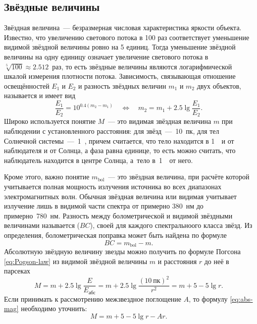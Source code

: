 \subsection{Звёздные величины}
Звёздная величина~--- безразмерная числовая характеристика яркости объекта. Известно, что увеличению светового потока в 100 раз соответствует уменьшение видимой звёздной величины ровно на 5 единиц. Тогда уменьшение звёздной величины на одну единицу означает увеличение светового потока в $\sqrt[5]{100}\approx 2.512$~раз, то есть звёздные величины являются логарифмической шкалой измерения плотности потока. Зависимость, связывающая отношение освещённостей $E_1$ и $E_2$ и разность звёздных величин $m_1$ и $m_2$ двух объектов, называется  и имеет вид
\begin{equation}
	\frac{E_1}{E_2} = 10^{0.4(m_2 - m_1)} \quad \Longleftrightarrow \quad m_2 = m_1 + 2.5 \lg \frac{E_1}{E_2}.
	\label{eq:Pogson-law}
\end{equation}
Широко используется понятие  $M$~--- это видимая звёздная величина $m$ при наблюдении с установленного расстояния: для звёзд~---~10~пк, для тел Солнечной системы~---~1~\au, причем считается, что тело находится в 1~\au~и от наблюдателя и от Солнца, а фаза равна единице, то есть можно считать, что наблюдатель находится в центре Солнца, а~тело в~1~\au~от него. 

Кроме этого, важно понятие  $m_\text{bol}$~--- это звёздная величина, при расчёте которой учитывается полная мощность излучения источника во всех диапазонах электромагнитных волн. Обычная звёздная величина или видимая учитывает излучение лишь в видимой части спектра от примерно 380~нм до примерно~780~нм. Разность между болометрической и видимой звёздными величинами называется  ($BC$), своей для каждого спектральноого класса звёзд. Из определения, болометрическая поправка может быть найдена по формуле
\begin{equation}
	BC = m_\text{bol} - m.
\end{equation}
Абсолютную звёздную величину звезды можно получить по формуле Погсона \eqref{eq:Pogson-law} из видимой звёздной величины $m$ и расстояния $r$ до неё в парсеках
\begin{equation}
	M = m + 2.5 \lg \frac{E}{E_\text{абс}} = m + 2.5 \lg \frac{(10~\text{пк})^2}{r^2} = m + 5 - 5\lg r.
	\label{eq:abs-mag}
\end{equation} 
Если принимать к рассмотрению межзвездное поглощение $A$, то формулу  \eqref{eq:abs-mag} необходимо уточнить:
\begin{equation}
	M = m + 5 - 5\lg r - Ar.
\end{equation}